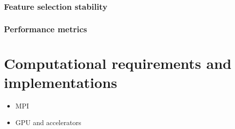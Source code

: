     \subsubsection{Feature selection stability}
    \subsubsection{Performance metrics}


\section{Computational requirements and implementations} \label{sec:implementation}
\begin{itemize}
  \item MPI
  \item GPU and accelerators
\end{itemize}
